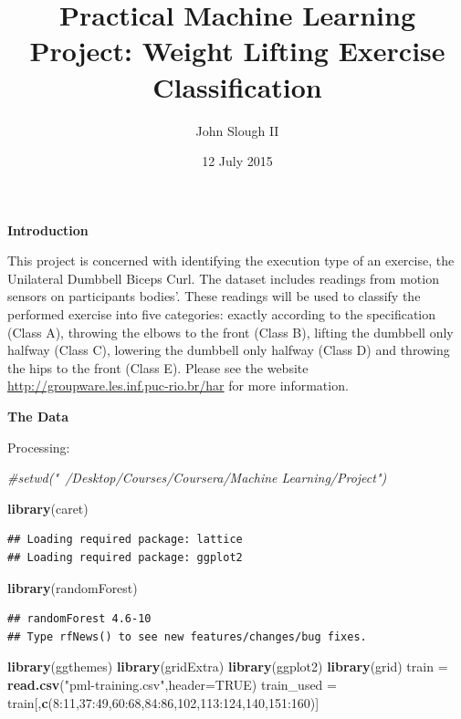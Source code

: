 \documentclass[]{article}
\title{Practical Machine Learning Project: Weight Lifting Exercise
Classification}
\author{John Slough II}
\date{12 July 2015}
\newenvironment{Shaded}{\begin{snugshade}}{\end{snugshade}}
\newcommand{\KeywordTok}[1]{\textcolor[rgb]{0.13,0.29,0.53}{\textbf{{#1}}}}
\newcommand{\DataTypeTok}[1]{\textcolor[rgb]{0.13,0.29,0.53}{{#1}}}
\newcommand{\DecValTok}[1]{\textcolor[rgb]{0.00,0.00,0.81}{{#1}}}
\newcommand{\StringTok}[1]{\textcolor[rgb]{0.31,0.60,0.02}{{#1}}}
\newcommand{\CommentTok}[1]{\textcolor[rgb]{0.56,0.35,0.01}{\textit{{#1}}}}
\newcommand{\OtherTok}[1]{\textcolor[rgb]{0.56,0.35,0.01}{{#1}}}
\newcommand{\NormalTok}[1]{{#1}}
\begin{document}
\maketitle

\textbf{Introduction}

This project is concerned with identifying the execution type of an
exercise, the Unilateral Dumbbell Biceps Curl. The dataset includes
readings from motion sensors on participants bodies'. These readings
will be used to classify the performed exercise into five categories:
exactly according to the specification (Class A), throwing the elbows to
the front (Class B), lifting the dumbbell only halfway (Class C),
lowering the dumbbell only halfway (Class D) and throwing the hips to
the front (Class E). Please see the website
\url{http://groupware.les.inf.puc-rio.br/har} for more information.

\textbf{The Data}

Processing:

\begin{Shaded}
\begin{Highlighting}[]
\CommentTok{#setwd("~/Desktop/Courses/Coursera/Machine Learning/Project")}

\KeywordTok{library}\NormalTok{(caret)}
\end{Highlighting}
\end{Shaded}

\begin{verbatim}
## Loading required package: lattice
## Loading required package: ggplot2
\end{verbatim}

\begin{Shaded}
\begin{Highlighting}[]
\KeywordTok{library}\NormalTok{(randomForest)}
\end{Highlighting}
\end{Shaded}

\begin{verbatim}
## randomForest 4.6-10
## Type rfNews() to see new features/changes/bug fixes.
\end{verbatim}

\begin{Shaded}
\begin{Highlighting}[]
\KeywordTok{library}\NormalTok{(ggthemes)}
\KeywordTok{library}\NormalTok{(gridExtra)}
\KeywordTok{library}\NormalTok{(ggplot2)}
\KeywordTok{library}\NormalTok{(grid)}
\NormalTok{train =}\StringTok{ }\KeywordTok{read.csv}\NormalTok{(}\StringTok{"pml-training.csv"}\NormalTok{,}\DataTypeTok{header=}\OtherTok{TRUE}\NormalTok{)}
\NormalTok{train_used =}\StringTok{ }\NormalTok{train[,}\KeywordTok{c}\NormalTok{(}\DecValTok{8}\NormalTok{:}\DecValTok{11}\NormalTok{,}\DecValTok{37}\NormalTok{:}\DecValTok{49}\NormalTok{,}\DecValTok{60}\NormalTok{:}\DecValTok{68}\NormalTok{,}\DecValTok{84}\NormalTok{:}\DecValTok{86}\NormalTok{,}\DecValTok{102}\NormalTok{,}\DecValTok{113}\NormalTok{:}\DecValTok{124}\NormalTok{,}\DecValTok{140}\NormalTok{,}\DecValTok{151}\NormalTok{:}\DecValTok{160}\NormalTok{)]}
\end{Highlighting}
\end{Shaded}
\end{document}
